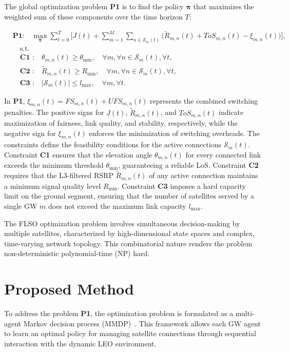 The global optimization problem \textbf{P1} is to find the policy $\boldsymbol{\pi}$ that maximizes the weighted sum of these components over the time horizon $T$:

\begin{align}
& \textbf{P1:}\quad \operatorname*{\max}_{\boldsymbol{\pi}} \sum_{t=0}^{T} \Big[ J(t) + \sum_{m=1}^{M} \sum_{n \in \mathcal{S}_m(t)} \Big( \widetilde{R}_{m,n}(t) + ToS_{m,n}(t) - \xi_{m,n}(t) \Big) \Big],\\
& \quad \text{s.t.} \nonumber \\
& \quad \textbf{C1 :}\quad \theta_{m,n}(t) \geq \theta_{\text {min}}, \quad \forall m, \forall n \in \mathcal{S}_m(t), \forall t,\\
& \quad \textbf{C2 :}\quad \widetilde R_{m,n}(t) \geq R_{\text {min}}, \quad \forall m, \forall n \in \mathcal{S}_m(t), \forall t,\\
& \quad \textbf{C3 :}\quad |\mathcal{S}_m(t)| \le l_{\text{max}}, \quad \forall m, \forall t.
\end{align}

In \textbf{P1}, $\xi_{m,n}(t) = FS_{m,n}(t) + UFS_{m,n}(t)$ represents the combined switching penalties. The positive signs for $J(t)$, $\widetilde{R}_{m,n}(t)$, and $ToS_{m,n}(t)$ indicate maximization of fairness, link quality, and stability, respectively, while the negative sign for $\xi_{m,n}(t)$ enforces the minimization of switching overheads.
The constraints define the feasibility conditions for the active connections $\mathcal{S}_m(t)$.
Constraint \textbf{C1} ensures that the elevation angle $\theta_{m,n}(t)$ for every connected link exceeds the minimum threshold $\theta_{\min}$, guaranteeing a reliable LoS.
Constraint \textbf{C2} requires that the L3-filtered RSRP $\widetilde{R}_{m,n}(t)$ of any active connection maintains a minimum signal quality level $R_{\min}$.
Constraint \textbf{C3} imposes a hard capacity limit on the ground segment, ensuring that the number of satellites served by a single GW $m$ does not exceed the maximum link capacity $l_{\text{max}}$.

The FLSO optimization problem involves simultaneous decision-making by multiple satellites, characterized by high-dimensional state spaces and complex, time-varying network topology. This combinatorial nature renders the problem non-deterministic polynomial-time (NP) hard.

\section{Proposed Method}
\quad To address the problem \textbf{P1}, the optimization problem is formulated as a multi-agent Markov decision process (MMDP)~\cite{ju2023achieving}. This framework allows each GW agent to learn an optimal policy for managing satellite connections through sequential interaction with the dynamic LEO environment.

